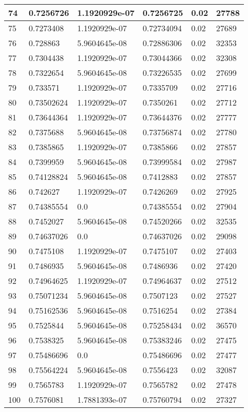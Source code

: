 \begin{longtable}{|l|l|l|l|l|l|}
74 & 0.7256726 & 1.1920929e-07 & 0.7256725 & 0.02 & 27788 \\ \hline 
75 & 0.7273408 & 1.1920929e-07 & 0.72734094 & 0.02 & 27689 \\ \hline 
76 & 0.728863 & 5.9604645e-08 & 0.72886306 & 0.02 & 32353 \\ \hline 
77 & 0.7304438 & 1.1920929e-07 & 0.73044366 & 0.02 & 32308 \\ \hline 
78 & 0.7322654 & 5.9604645e-08 & 0.73226535 & 0.02 & 27699 \\ \hline 
79 & 0.733571 & 1.1920929e-07 & 0.7335709 & 0.02 & 27716 \\ \hline 
80 & 0.73502624 & 1.1920929e-07 & 0.7350261 & 0.02 & 27712 \\ \hline 
81 & 0.73644364 & 1.1920929e-07 & 0.73644376 & 0.02 & 27777 \\ \hline 
82 & 0.7375688 & 5.9604645e-08 & 0.73756874 & 0.02 & 27780 \\ \hline 
83 & 0.7385865 & 1.1920929e-07 & 0.7385866 & 0.02 & 27857 \\ \hline 
84 & 0.7399959 & 5.9604645e-08 & 0.73999584 & 0.02 & 27987 \\ \hline 
85 & 0.74128824 & 5.9604645e-08 & 0.7412883 & 0.02 & 27857 \\ \hline 
86 & 0.742627 & 1.1920929e-07 & 0.7426269 & 0.02 & 27925 \\ \hline 
87 & 0.74385554 & 0.0 & 0.74385554 & 0.02 & 27904 \\ \hline 
88 & 0.7452027 & 5.9604645e-08 & 0.74520266 & 0.02 & 32535 \\ \hline 
89 & 0.74637026 & 0.0 & 0.74637026 & 0.02 & 29098 \\ \hline 
90 & 0.7475108 & 1.1920929e-07 & 0.7475107 & 0.02 & 27403 \\ \hline 
91 & 0.7486935 & 5.9604645e-08 & 0.7486936 & 0.02 & 27420 \\ \hline 
92 & 0.74964625 & 1.1920929e-07 & 0.74964637 & 0.02 & 27512 \\ \hline 
93 & 0.75071234 & 5.9604645e-08 & 0.7507123 & 0.02 & 27527 \\ \hline 
94 & 0.75162536 & 5.9604645e-08 & 0.7516254 & 0.02 & 27384 \\ \hline 
95 & 0.7525844 & 5.9604645e-08 & 0.75258434 & 0.02 & 36570 \\ \hline 
96 & 0.7538325 & 5.9604645e-08 & 0.75383246 & 0.02 & 27475 \\ \hline 
97 & 0.75486696 & 0.0 & 0.75486696 & 0.02 & 27477 \\ \hline 
98 & 0.75564224 & 5.9604645e-08 & 0.7556423 & 0.02 & 32087 \\ \hline 
99 & 0.7565783 & 1.1920929e-07 & 0.7565782 & 0.02 & 27478 \\ \hline 
100 & 0.7576081 & 1.7881393e-07 & 0.75760794 & 0.02 & 27327 \\ \hline 
\end{longtable}